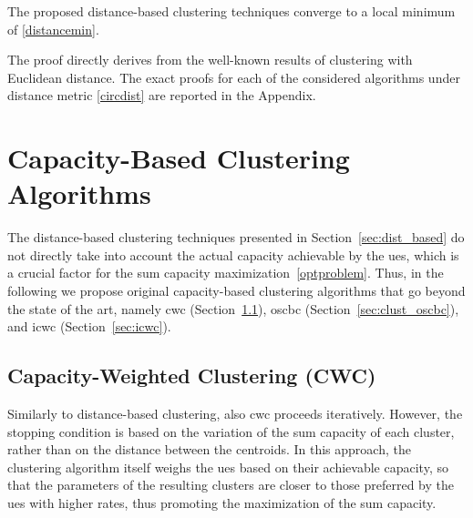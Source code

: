 \begin{theorem}\label{th_distancebased}
    The proposed distance-based clustering techniques converge to a local minimum of \eqref{distancemin}.
\end{theorem}
\begin{IEEEproof}[Proof] 
The proof directly derives from the well-known results of clustering with Euclidean distance. The exact proofs for each of the considered algorithms under distance metric \eqref{circdist} are reported in the Appendix.
\end{IEEEproof}

\section{Capacity-Based Clustering Algorithms}
\label{sec:cap_based}
The distance-based clustering techniques presented in Section~\ref{sec:dist_based} do not directly take into account the actual capacity achievable by the \glspl{ue}, which is a crucial factor for the sum capacity maximization~\eqref{optproblem}. Thus, in the following we propose original capacity-based clustering algorithms that go beyond the state of the art, namely \gls{cwc} (Section~\ref{sec:cwc}), \gls{oscbc} (Section~\ref{sec:clust_oscbc}), and \gls{icwc} (Section~\ref{sec:icwc}).

\subsection{Capacity-Weighted Clustering (CWC)}
\label{sec:cwc}

Similarly to distance-based clustering, also \gls{cwc} proceeds iteratively. However, the stopping condition is based on the variation of the sum capacity of each cluster, rather than on the distance between the centroids. 
In this approach, the clustering algorithm itself weighs the \glspl{ue} based on their achievable capacity, so that the parameters of the resulting clusters are closer to those preferred by the \glspl{ue} with higher rates, thus promoting the maximization of the sum capacity.


